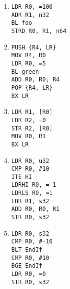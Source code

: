 \documentclass{article}
\begin{document}
\begin{enumerate}
\begin{multicols}{2}
\begin{enumerate}
            \item
                \texttt{LDR R0, =100   \\
                ADR R1, n32 \\
                BL foo      \\
                STRD R0, R1, n64 \\
                }
            \item
                \texttt{PUSH \{R4, LR\}    \\
                MOV R4, R0  \\
                LDR R0, =5  \\
                BL green    \\
                ADD R0, R0, R4  \\
                POP \{R4, LR\} \\
                BX LR       \\
                }
            \item
                \texttt{LDR R1, [R0]    \\
                LDR R2, =0  \\
                STR R2, [R0]    \\
                MOV R0, R1  \\
                BX LR       \\
                }
            \item
                \texttt{LDR R0, u32 \\
                CMP R0, \#10 \\
                ITE  HI  \\
                LDRHI R0, =-1 \\
                LDRLS R0, =1  \\
                LDR R1, s32 \\
                ADD R0, R0, R1  \\
                STR R0, s32 \\
                }
            \item
                \texttt{LDR R0, s32 \\
                CMP R0, \#-10   \\
                BLT EndIf   \\
                CMP R0, \#10    \\ 
                BGE EndIf   \\
                LDR R0, =0  \\
                STR R0, s32 \\
}
\end{enumerate}
\end{multicols}
\end{enumerate}
\end{document}
